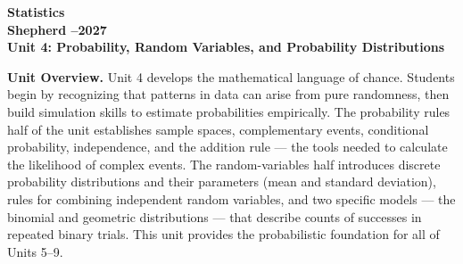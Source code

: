 \documentclass[10pt]{article}
\begin{document}
\vspace{-1.3in}

\begin{center}
  {\color{white}\bfseries\fontsize{28}{34}\selectfont Statistics}\\[8pt]
  {\color{goldacc}\bfseries\Large Shepherd --2027}\\[14pt]
  {\color{white}\bfseries\LARGE Unit 4: Probability, Random Variables, and Probability Distributions}\\[4pt]
\end{center}

\vspace{0.30in}

\begin{tcolorbox}[colback=sky,colframe=navy,boxrule=0.9pt,arc=2mm,
    left=4mm,right=4mm,top=3mm,bottom=3mm]
  \textbf{Unit Overview.}\quad
  Unit 4 develops the mathematical language of chance.  Students begin by recognizing
  that patterns in data can arise from pure randomness, then build simulation skills
  to estimate probabilities empirically.  The probability rules half of the unit
  establishes sample spaces, complementary events, conditional probability,
  independence, and the addition rule --- the tools needed to calculate the likelihood
  of complex events.  The random-variables half introduces discrete probability
  distributions and their parameters (mean and standard deviation), rules for combining
  independent random variables, and two specific models --- the binomial and geometric
  distributions --- that describe counts of successes in repeated binary trials.
  This unit provides the probabilistic foundation for all of Units 5--9.
\end{tcolorbox}

\vspace{0.22in}
\end{document}
